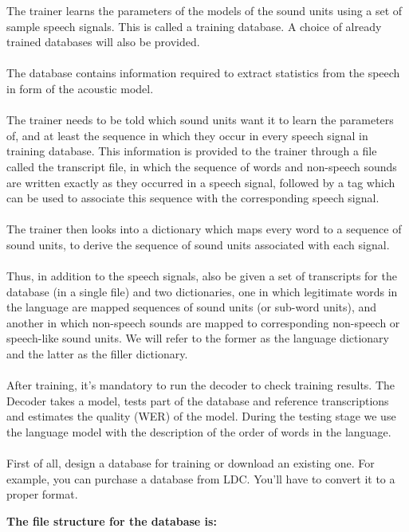 \documentclass[12pt,a4paper,oldfontcommands]{memoir}
\begin{document}
The trainer learns the parameters of the models of the sound units using a set of sample speech signals. This is called a training database. A choice of already trained databases will also be provided.\\\\
The database contains information required to extract statistics from the speech in form of the acoustic model.\\\\
The trainer needs to be told which sound units want it to learn the parameters of, and at least the sequence in which they occur in every speech signal in training database. This information is provided to the trainer through a file called the transcript file, in which the sequence of words and non-speech sounds are written exactly as they occurred in a speech signal, followed by a tag which can be used to associate this sequence with the corresponding speech signal.\\\\
The trainer then looks into a dictionary which maps every word to a sequence of sound units, to derive the sequence of sound units associated with each signal.\\\\
Thus, in addition to the speech signals, also be given a set of transcripts for the database (in a single file) and two dictionaries, one in which legitimate words in the language are mapped sequences of sound units (or sub-word units), and another in which non-speech sounds are mapped to corresponding non-speech or speech-like sound units. We will refer to the former as the language dictionary and the latter as the filler dictionary.\\\\
After training, it's mandatory to run the decoder to check training results. The Decoder takes a model, tests part of the database and reference transcriptions and estimates the quality (WER) of the model. During the testing stage we use the language model with the description of the order of words in the language.\\\\
First of all, design a database for training or download an existing one. For example, you can purchase a database from LDC. You'll have to convert it to a proper format. 

\textbf{The file structure for the database is:} 
\end{document}

